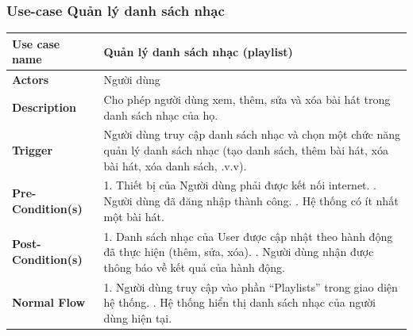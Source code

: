 \documentclass[a4paper]{article}
\begin{document}
\subsubsection{Use-case Quản lý danh sách nhạc}
\begin{table}[H]
	\centering
	\renewcommand{\arraystretch}{1.3} %
	\begin{tabularx}{\textwidth}{|l|X|}
		\hline
		\textbf{Use case name} & Quản lý danh sách nhạc (playlist)                                                                                                                                                             \\ \hline
		\textbf{Actors}        & Người dùng                                                                                                                                                                         \\ \hline
		\textbf{Description}   & Cho phép người dùng xem, thêm, sửa và xóa bài hát trong danh sách nhạc của họ.                                                                                                     \\ \hline
		\textbf{Trigger}       & Người dùng truy cập danh sách nhạc và chọn một chức năng quản lý danh sách nhạc (tạo danh sách, thêm bài hát, xóa bài hát, xóa danh sách, .v.v).                                   \\ \hline
		\textbf{Pre-Condition(s)}
		                       & 1. Thiết bị của Người dùng phải được kết nối internet. \newline
		2. Người dùng đã đăng nhập thành công. \newline
		3. Hệ thống có ít nhất một bài hát.                                                                                                                                                                         \\ \hline
		\textbf{Post-Condition(s)}
		                       & 1. Danh sách nhạc của User được cập nhật theo hành động đã thực hiện (thêm, sửa, xóa). \newline
		2. Người dùng nhận được thông báo về kết quả của hành động.                                                                                                                                                 \\ \hline
		\textbf{Normal Flow}
		                       & 1. Người dùng truy cập vào phần “Playlists” trong giao diện hệ thống. \newline
		2. Hệ thống hiển thị danh sách nhạc của người dùng hiện tại. \newline

\end{tabularx}
\end{table}
\end{document}
